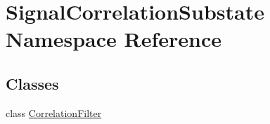 \hypertarget{namespaceSignalCorrelationSubstate}{}\section{Signal\+Correlation\+Substate Namespace Reference}
\label{namespaceSignalCorrelationSubstate}
\subsection*{Classes}
\begin{DoxyCompactItemize}
\item 
class \hyperlink{classSignalCorrelationSubstate_1_1CorrelationFilter}{Correlation\+Filter}
\end{DoxyCompactItemize}
